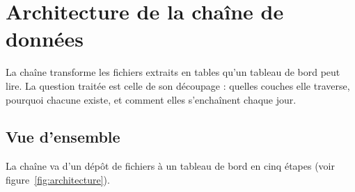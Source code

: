 \chapter{Architecture de la chaîne de données}\label{chap:architecture}

La chaîne transforme les fichiers extraits en tables qu'un tableau de bord peut lire. La question
traitée est celle de son découpage : quelles couches elle traverse, pourquoi chacune existe, et
comment elles s'enchaînent chaque jour.

\section{Vue d'ensemble}

La chaîne va d'un dépôt de fichiers à un tableau de bord en cinq étapes (voir
figure~\ref{fig:architecture}).

